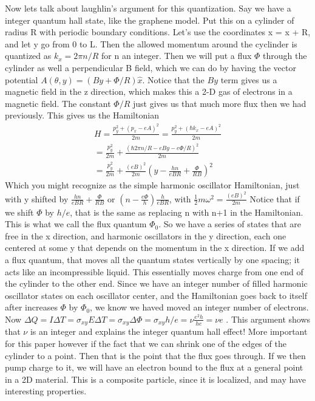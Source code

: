 Now lets talk about laughlin's argument for this quantization.
Say we have a integer quantum hall state, like the graphene model. Put this on a cylinder of radius R with periodic boundary conditions. Let's use the coordinates x = x + R, and let y go from 0 to L. Then the allowed momentum around the cyclinder is quantized as $k_x= 2\pi n/R$ for n an integer. Then we will put a flux $\Phi$ through the cylinder as well a perpendicular B field, which we can do by having the vector potential $A(\theta,y) = (By+\Phi /R)\hat{x}$. Notice that the $By$ term gives us a magnetic field in the z direction, which makes this a 2-D gas of electrons in a magnetic field. The constant $\Phi/R$ just gives us that much more flux then we had previously. This gives us the Hamiltonian 
\begin{align}
H = \frac{p_y^2 +(p_x-eA)^2}{2m} = \frac{p_y^2 +(\hbar k_x - eA)^2}{2m} \\
= \frac{p_y^2}{2m} +\frac{(\hbar 2\pi n/R-eBy-e\Phi /R )^2}{2m}\\
= \frac{p_y^2}{2m} +\frac{(eB)^2}{2m}(y-\frac{hn}{eBR}+\frac{\Phi }{RB} )^2
\end{align}
Which you might recognize as the simple harmonic oscillator Hamiltonian, just with y shifted by $\frac{hn}{eBR}+\frac{\Phi }{RB}$ or $(n-\frac{e\Phi}{h})\frac{h}{eBR}$, with $\frac{1}{2}m\omega^2 = \frac{(eB)^2}{2m}$
Notice that if we shift $\Phi$ by $h/e$, that is the same as replacing n with n+1 in the Hamiltonian. This is what we call the flux quantum $\Phi_0$. So we have a series of states that are free in the x direction, and harmonic oscillators in the y direction, each one centered at some y that depends on the momentum in the x direction. If we add a flux quantum, that moves all the quantum states vertically by one spacing; it acts like an incompressible liquid. This essentially moves charge from one end of the cylinder to the other end. Since we have an integer number of filled harmonic oscillator states on each oscillator center, and the Hamiltonian goes back to itself after increases $\Phi$ by $\Phi_0$, we know we haved moved an integer number of electrons. Now $\Delta Q = I \Delta T = \sigma_{xy}E \Delta T = \sigma_{xy} \Delta \Phi = \sigma_{xy} h/e = \nu \frac{e^2h}{he} = \nu e $ . This argument shows that $\nu$ is an integer and explains the integer quantum hall effect! More important for this paper however if the fact that we can shrink one of the edges of the cylinder to a point. Then that is the point that the flux goes through. If we then pump charge to it, we will have an electron bound to the flux at a general point in a 2D material. This is a composite particle, since it is localized, and may have interesting properties.


